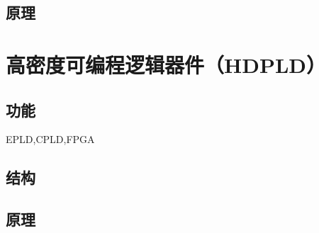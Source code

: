 \subsection{原理}


\newpage
\section{高密度可编程逻辑器件（HDPLD）}

\subsection{功能}

EPLD,CPLD,FPGA

\subsection{结构}

\subsection{原理}



\newpage
